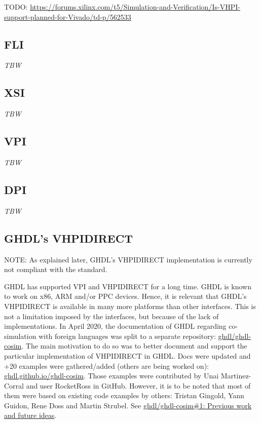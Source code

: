 \documentclass[
]{article}
\begin{document}
TODO: \url{https://forums.xilinx.com/t5/Simulation-and-Verification/Is-VHPI-support-planned-for-Vivado/td-p/562533}

\hypertarget{fli}{%
\subsection{FLI}\label{fli}}

\emph{TBW}

\hypertarget{xsi}{%
\subsection{XSI}\label{xsi}}

\emph{TBW}

\hypertarget{vpi}{%
\subsection{VPI}\label{vpi}}

\emph{TBW}

\hypertarget{dpi}{%
\subsection{DPI}\label{dpi}}

\emph{TBW}

\hypertarget{ghdls-vhpidirect}{%
\subsection{GHDL's VHPIDIRECT}\label{ghdls-vhpidirect}}

NOTE: As explained later, GHDL's VHPIDIRECT implementation is currently not compliant with the standard.

GHDL has supported VPI and VHPIDIRECT for a long time. GHDL is known to work on x86, ARM and/or PPC devices. Hence, it is relevant that GHDL's VHPIDIRECT is available in many more platforms than other interfaces. This is not a limitation imposed by the interfaces, but because of the lack of implementations.
In April 2020, the documentation of GHDL regarding co-simulation with foreign languages was split to a separate repository: \href{https://github.com/ghdl/ghdl-cosim}{ghdl/ghdl-cosim}. The main motivation to do so was to better document and support the particular implementation of VHPIDIRECT in GHDL. Docs were updated and +20 examples were gathered/added (others are being worked on): \href{https://ghdl.github.io/ghdl-cosim/}{ghdl.github.io/ghdl-cosim}. Those examples were contributed by Unai Martinez-Corral and user RocketRoss in GitHub. However, it is to be noted that most of them were based on existing code examples by others: Tristan Gingold, Yann Guidon, Rene Doss and Martin Strubel. See \href{https://github.com/ghdl/ghdl-cosim/issues/1}{ghdl/ghdl-cosim\#1: Previous work and future ideas}.
\end{document}
